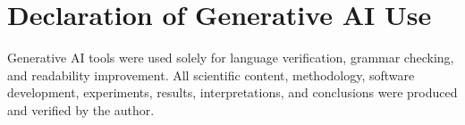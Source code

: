\section*{Declaration of Generative AI Use}
Generative AI tools were used solely for language verification, grammar checking, and
readability improvement. All scientific content, methodology, software development,
experiments, results, interpretations, and conclusions were produced and verified by the
author.
